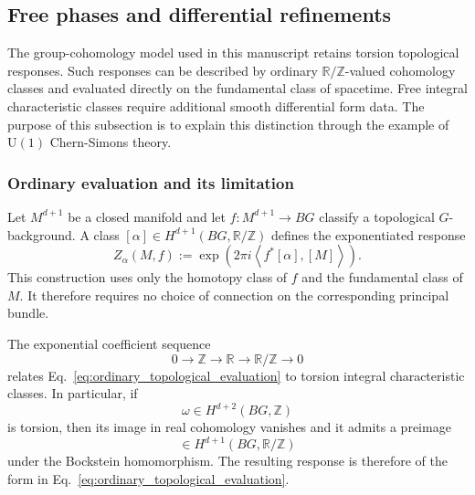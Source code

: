 \documentclass[aps,prx,reprint,superscriptaddress,twocolumn,amsmath,amssymb,amsfonts, nofootinbib]{revtex4-2}
\newcommand{\U}{\text{U}}
\theoremstyle{apsstyle}
\begin{document}
\subsection{Free phases and differential refinements}
\label{app:diff_refinement}

The group-cohomology model used in this manuscript retains torsion
topological responses. Such responses can be described by ordinary
$\mathbb R/\mathbb Z$-valued cohomology classes and evaluated directly
on the fundamental class of spacetime. Free integral characteristic
classes require additional smooth differential form data. The purpose of this subsection is to explain this distinction through the example of
$\U(1)$ Chern-Simons theory.

\subsubsection{Ordinary evaluation and its limitation}

Let $M^{d+1}$ be a closed manifold and let $f:M^{d+1}\to BG$ classify a topological $G$-background. A class $[\alpha]\in H^{d+1}(BG,\mathbb R/\mathbb Z)$ defines the exponentiated response
\begin{equation}
    Z_{\alpha}(M,f)
    :=
    \exp\left(
        2\pi i
        \left\langle
            f^*[\alpha],
            [M]
        \right\rangle
    \right).
    \label{eq:ordinary_topological_evaluation}
\end{equation}
This construction uses only the homotopy class of $f$ and the
fundamental class of $M$. It therefore requires no choice of connection
on the corresponding principal bundle.

\noindent The exponential coefficient sequence
\begin{equation*}
    0
    \longrightarrow
    \mathbb Z
    \longrightarrow
    \mathbb R
    \longrightarrow
    \mathbb R/\mathbb Z
    \longrightarrow
    0
\end{equation*}
relates Eq.~\eqref{eq:ordinary_topological_evaluation} to torsion
integral characteristic classes. In particular, if
\begin{equation*}
    \omega\in H^{d+2}(BG,\mathbb Z)
\end{equation*}
is torsion, then its image in real cohomology vanishes and it admits a
preimage
\begin{equation*}
    [\alpha]\in H^{d+1}(BG,\mathbb R/\mathbb Z)
\end{equation*}
under the Bockstein homomorphism. The resulting response is therefore
of the form in Eq.~\eqref{eq:ordinary_topological_evaluation}.
\end{document}
